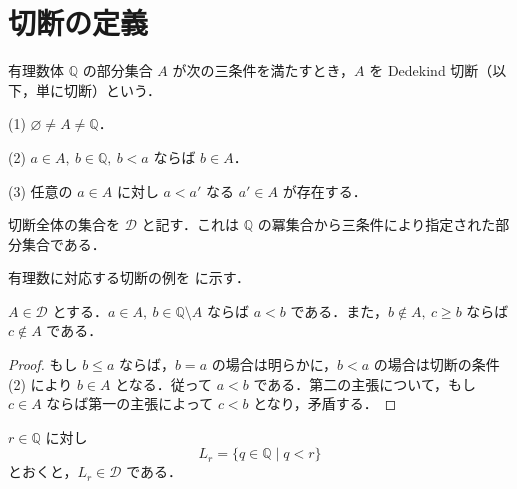 \section{切断の定義}
\begin{defn}[Dedekind切断]
有理数体 $\mathbb Q$ の部分集合 $A$ が次の三条件を満たすとき，$A$ を Dedekind 切断（以下，単に切断）という．

(1) $\varnothing\ne A\ne\mathbb Q$．

(2) $a\in A,\ b\in\mathbb Q,\ b<a$ ならば $b\in A$．

(3) 任意の $a\in A$ に対し $a<a'$ なる $a'\in A$ が存在する．

切断全体の集合を $\mathcal D$ と記す．これは $\mathbb Q$ の冪集合から三条件により指定された部分集合である．
\end{defn}
有理数に対応する切断の例を  に示す．
\begin{prop}[切断とその補集合]
$A\in\mathcal D$ とする．$a\in A,\ b\in\mathbb Q\setminus A$ ならば $a<b$ である．また，$b\notin A,\ c\geq b$ ならば $c\notin A$ である．
\end{prop}
\begin{proof}
もし $b\leq a$ ならば，$b=a$ の場合は明らかに，$b<a$ の場合は切断の条件 (2) により $b\in A$ となる．従って $a<b$ である．第二の主張について，もし $c\in A$ ならば第一の主張によって $c<b$ となり，矛盾する．
\end{proof}
\begin{prop}[有理数に対応する切断]
$r\in\mathbb Q$ に対し
\[
 L_r=\{q\in\mathbb Q\mid q<r\}
\]
とおくと，$L_r\in\mathcal D$ である．
\end{prop}
